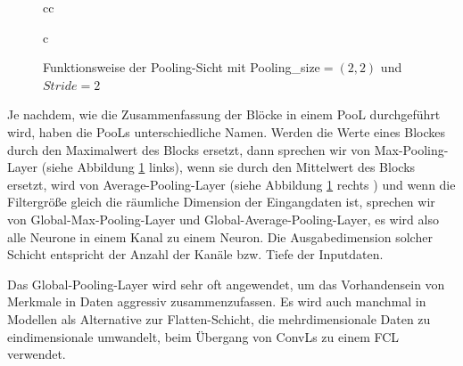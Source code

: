 \documentclass[12pt,a4paper]{scrartcl}
\numberwithin{equation}{section}
\def\Arrow{\raisebox{3\height}{\scalebox{1}{$\xRightarrow[.]{.}$}}}
\begin{document}
\begin{figure}[h]
\begin{tabular}{cc}
\begin{tabular}{c}
\Arrow
				
			\end{tabular}

		
	\end{tabular}
			\caption{Funktionsweise der Pooling-Sicht mit Pooling\_size$ =(2,2) $ und $ Stride =2$}
			\label{fig:Pooling}
\end{figure}

Je nachdem, wie die Zusammenfassung der Blöcke in einem \ac{PooL} durchgeführt wird, haben die \acsp{PooL} unterschiedliche Namen. Werden die Werte eines Blockes durch den Maximalwert des Blocks ersetzt, dann sprechen wir von Max-Pooling-Layer (siehe Abbildung \ref{fig:Pooling} links), wenn sie durch den Mittelwert  des Blocks ersetzt, wird von Average-Pooling-Layer (siehe Abbildung \ref{fig:Pooling} rechts ) und wenn die Filtergröße gleich die räumliche Dimension der Eingangdaten ist, sprechen wir von Global-Max-Pooling-Layer und Global-Average-Pooling-Layer, es wird also alle Neurone in einem Kanal zu einem Neuron. Die Ausgabedimension solcher Schicht entspricht der Anzahl der Kanäle bzw. Tiefe der Inputdaten.

Das Global-Pooling-Layer wird sehr oft angewendet, um das Vorhandensein von Merkmale in Daten aggressiv zusammenzufassen. Es wird auch manchmal in Modellen als Alternative zur Flatten-Schicht, die mehrdimensionale Daten zu eindimensionale umwandelt, beim Übergang von \acsp{ConvL} zu einem \ac{FCL}  verwendet.
\end{document}
